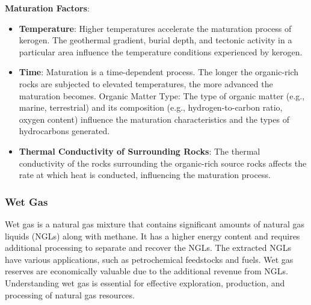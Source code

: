\documentclass{article}
\begin{document}
\textbf{Maturation Factors}:
    \begin{itemize}
        \item \textbf{Temperature}: Higher temperatures accelerate the maturation process of kerogen. The geothermal gradient, burial depth, and tectonic activity in a particular area influence the temperature conditions experienced by kerogen.
        \item \textbf{Time}: Maturation is a time-dependent process. The longer the organic-rich rocks are subjected to elevated temperatures, the more advanced the maturation becomes.
        Organic Matter Type: The type of organic matter (e.g., marine, terrestrial) and its composition (e.g., hydrogen-to-carbon ratio, oxygen content) influence the maturation characteristics and the types of hydrocarbons generated.
        \item \textbf{Thermal Conductivity of Surrounding Rocks}: The thermal conductivity of the rocks surrounding the organic-rich source rocks affects the rate at which heat is conducted, influencing the maturation process.
    \end{itemize}

    \subsubsection*{Wet Gas}
    Wet gas is a natural gas mixture that contains significant amounts of natural gas liquids (NGLs) along with methane. It has a higher energy content and requires additional processing to separate and recover the NGLs. The extracted NGLs have various applications, such as petrochemical feedstocks and fuels. Wet gas reserves are economically valuable due to the additional revenue from NGLs. Understanding wet gas is essential for effective exploration, production, and processing of natural gas resources.\\ 
\end{document}

